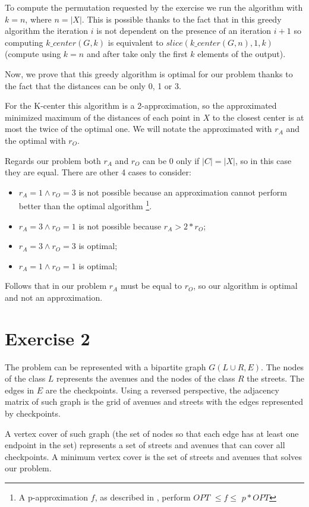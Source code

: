 \documentclass[paper=a4, fontsize=11pt]{scrartcl} %
\numberwithin{equation}{section} %
\numberwithin{figure}{section} %
\numberwithin{table}{section} %
\begin{document}
To compute the permutation requested by the exercise we run the algorithm with $k = n$, where $n = |X|$.
This is possible thanks to the fact that in this greedy algorithm the iteration $i$ is not dependent on the presence of an iteration $i+1$ so computing $k\_center(G, k)$ is equivalent to $slice(k\_center(G, n), 1, k)$ (compute using $k=n$ and after take only the first $k$ elements of the output).

Now, we prove that this greedy algorithm is optimal for our problem thanks to the fact that the distances can be only 0, 1 or 3.

For the K-center this algorithm is a 2-approximation, so the approximated minimized maximum of the distances of each point in $X$ to the closest center is at most the twice of the optimal one.
We will notate the approximated with $r_A$ and the optimal with $r_O$.

Regards our problem both $r_A$ and $r_O$ can be 0 only if $|C| = |X|$, so in this case they are equal.
There are other 4 cases to consider:

\begin{itemize}
    \item $r_A = 1 \land r_O = 3$ is not possible because an approximation cannot perform better than the optimal algorithm \footnote{A p-approximation $f$, as described in \cite{app}, perform $OPT$ $\leq f \leq$ $p*OPT$}.
    \item $r_A = 3 \land r_O = 1$ is not possible because $r_A > 2*r_O$;
    \item $r_A = 3 \land r_O = 3$ is optimal;
    \item $r_A = 1 \land r_O = 1$ is optimal;
\end{itemize}

Follows that in our problem $r_A$ must be equal to $r_O$, so our algorithm is optimal and not an approximation.

\bigskip
\section*{Exercise 2}

The problem can be represented with a bipartite graph $G(L \cup R, E)$.
The nodes of the class $L$ represents the avenues and the nodes of the class $R$ the streets.
The edges in $E$ are the checkpoints.
Using a reversed perspective, the adjacency matrix of such graph is the grid of avenues and streets with the edges represented by checkpoints.

A vertex cover of such graph (the set of nodes so that each edge has at least one endpoint in the set) represents a set of streets and avenues that can cover all checkpoints.
A minimum vertex cover is the set of streets and avenues that solves our problem.
\end{document}
